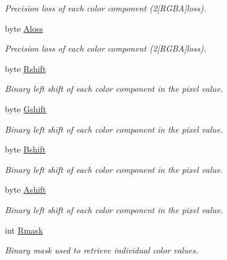 \begin{DoxyCompactItemize}
\begin{DoxyCompactList}\small\item\em Precision loss of each color component (2\mbox{[}RGBA\mbox{]}loss). \item\end{DoxyCompactList}\item 
byte \hyperlink{struct_s_d_l___pixel_format_af56c52509223f7ba9a9e3424622f64eb}{Aloss}
\begin{DoxyCompactList}\small\item\em Precision loss of each color component (2\mbox{[}RGBA\mbox{]}loss). \item\end{DoxyCompactList}\item 
byte \hyperlink{struct_s_d_l___pixel_format_a260fab59a09c90b1a4ee2a581a88c1c9}{Rshift}
\begin{DoxyCompactList}\small\item\em Binary left shift of each color component in the pixel value. \item\end{DoxyCompactList}\item 
byte \hyperlink{struct_s_d_l___pixel_format_afa974003c44cf2ce7bd5321cd337508f}{Gshift}
\begin{DoxyCompactList}\small\item\em Binary left shift of each color component in the pixel value. \item\end{DoxyCompactList}\item 
byte \hyperlink{struct_s_d_l___pixel_format_a1997c5cc46cd8e25fc2d231bfc704bed}{Bshift}
\begin{DoxyCompactList}\small\item\em Binary left shift of each color component in the pixel value. \item\end{DoxyCompactList}\item 
byte \hyperlink{struct_s_d_l___pixel_format_a2040187299e831186e04ac50c5dfba33}{Ashift}
\begin{DoxyCompactList}\small\item\em Binary left shift of each color component in the pixel value. \item\end{DoxyCompactList}\item 
int \hyperlink{struct_s_d_l___pixel_format_a10124e3f1900188b3dac9dd618bdefc6}{Rmask}
\begin{DoxyCompactList}\small\item\em Binary mask used to retrieve individual color values. \item\end{DoxyCompactList}\item 

\end{DoxyCompactItemize}
